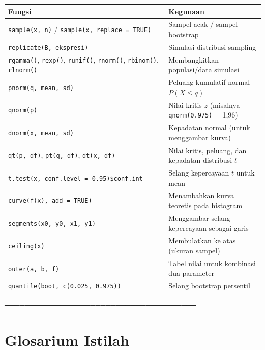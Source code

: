 \documentclass[
  indonesian,
  letterpaper,
]{book}
\newcounter{none} %
\begin{document}
{\def\LTcaptype{none} %
\begin{longtable}[]{@{}
  >{\raggedright\arraybackslash}p{}
  >{\raggedright\arraybackslash}p{}@{}}
\toprule\noalign{}
\begin{minipage}[b]{\linewidth}\raggedright
Fungsi
\end{minipage} & \begin{minipage}[b]{\linewidth}\raggedright
Kegunaan
\end{minipage} \\
\midrule\noalign{}
\endhead
\bottomrule\noalign{}
\endlastfoot
\texttt{sample(x,\ n)} / \texttt{sample(x,\ replace\ =\ TRUE)} & Sampel
acak / sampel bootstrap \\
\texttt{replicate(B,\ ekspresi)} & Simulasi distribusi sampling \\
\texttt{rgamma()}, \texttt{rexp()}, \texttt{runif()}, \texttt{rnorm()},
\texttt{rbinom()}, \texttt{rlnorm()} & Membangkitkan populasi/data
simulasi \\
\texttt{pnorm(q,\ mean,\ sd)} & Peluang kumulatif normal
\(P(X \leq q)\) \\
\texttt{qnorm(p)} & Nilai kritis \(z\) (misalnya \texttt{qnorm(0.975)} =
1,96) \\
\texttt{dnorm(x,\ mean,\ sd)} & Kepadatan normal (untuk menggambar
kurva) \\
\texttt{qt(p,\ df)}, \texttt{pt(q,\ df)}, \texttt{dt(x,\ df)} & Nilai
kritis, peluang, dan kepadatan distribusi \(t\) \\
\texttt{t.test(x,\ conf.level\ =\ 0.95)\$conf.int} & Selang kepercayaan
\(t\) untuk mean \\
\texttt{curve(f(x),\ add\ =\ TRUE)} & Menambahkan kurva teoretis pada
histogram \\
\texttt{segments(x0,\ y0,\ x1,\ y1)} & Menggambar selang kepercayaan
sebagai garis \\
\texttt{ceiling(x)} & Membulatkan ke atas (ukuran sampel) \\
\texttt{outer(a,\ b,\ f)} & Tabel nilai untuk kombinasi dua parameter \\
\texttt{quantile(boot,\ c(0.025,\ 0.975))} & Selang bootstrap
persentil \\
\end{longtable}
}

──────────────────────────────────────

\section{Glosarium Istilah}\label{glosarium-istilah}
\end{document}
